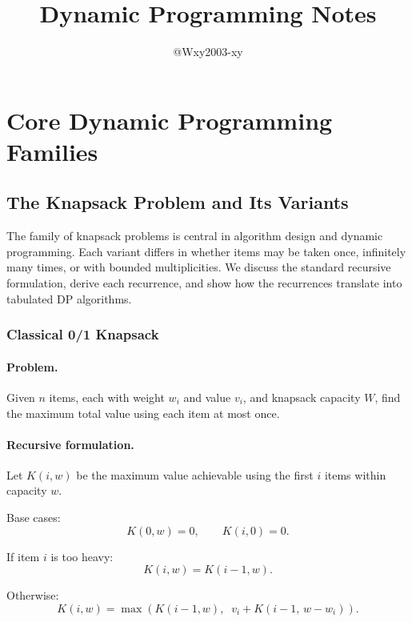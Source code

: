 \documentclass[9pt]{extarticle}
\begin{document}
\title{Dynamic Programming Notes}
\author{@Wxy2003-xy}
\date{}
\maketitle

\newpage
\tableofcontents
\newpage

\section{Core Dynamic Programming Families}
\subsection{The Knapsack Problem and Its Variants}

The family of knapsack problems is central in algorithm design and dynamic
programming.  Each variant differs in whether items may be taken once, 
infinitely many times, or with bounded multiplicities.  
We discuss the standard recursive formulation, derive each recurrence, and 
show how the recurrences translate into tabulated DP algorithms.

\subsubsection{Classical 0/1 Knapsack}

\paragraph{Problem.}
Given $n$ items, each with weight $w_i$ and value $v_i$, and knapsack capacity
$W$, find the maximum total value using each item at most once.

\paragraph{Recursive formulation.}
Let $K(i,w)$ be the maximum value achievable using the first $i$ items within
capacity $w$.

Base cases:
\[
K(0,w) = 0,\qquad K(i,0)=0.
\]

If item $i$ is too heavy:
\[
K(i,w) = K(i-1,w).
\]

Otherwise:
\[
K(i,w) = \max\left(K(i-1,w),\;\; v_i + K(i-1,\, w-w_i)\right).
\]
\end{document}
